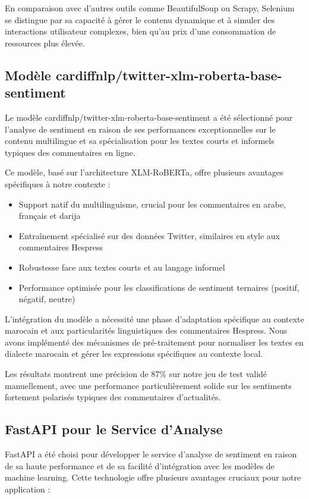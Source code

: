 En comparaison avec d'autres outils comme BeautifulSoup ou Scrapy, Selenium se distingue par sa capacité à gérer le contenu dynamique et à simuler des interactions utilisateur complexes, bien qu'au prix d'une consommation de ressources plus élevée.

\subsection{Modèle cardiffnlp/twitter-xlm-roberta-base-sentiment}
Le modèle cardiffnlp/twitter-xlm-roberta-base-sentiment a été sélectionné pour l'analyse de sentiment en raison de ses performances exceptionnelles sur le contenu multilingue et sa spécialisation pour les textes courts et informels typiques des commentaires en ligne.

Ce modèle, basé sur l'architecture XLM-RoBERTa, offre plusieurs avantages spécifiques à notre contexte :
\begin{itemize}
    \item Support natif du multilinguisme, crucial pour les commentaires en arabe, français et darija
    \item Entraînement spécialisé sur des données Twitter, similaires en style aux commentaires Hespress
    \item Robustesse face aux textes courts et au langage informel
    \item Performance optimisée pour les classifications de sentiment ternaires (positif, négatif, neutre)
\end{itemize}

L'intégration du modèle a nécessité une phase d'adaptation spécifique au contexte marocain et aux particularités linguistiques des commentaires Hespress. Nous avons implémenté des mécanismes de pré-traitement pour normaliser les textes en dialecte marocain et gérer les expressions spécifiques au contexte local.

Les résultats montrent une précision de 87\% sur notre jeu de test validé manuellement, avec une performance particulièrement solide sur les sentiments fortement polarisés typiques des commentaires d'actualités.

\subsection{FastAPI pour le Service d'Analyse}
FastAPI a été choisi pour développer le service d'analyse de sentiment en raison de sa haute performance et de sa facilité d'intégration avec les modèles de machine learning. Cette technologie offre plusieurs avantages cruciaux pour notre application :

